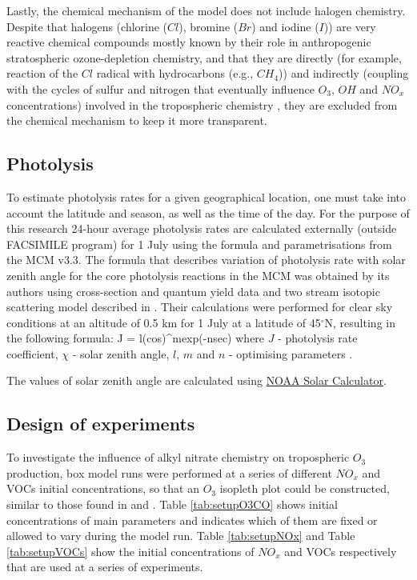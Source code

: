 \documentclass[11pt,a4paper]{article}
\newcounter{matriz}
\newenvironment{matriz}{\refstepcounter{matriz}\equation}{\tag{\thematriz}\endequation}
\begin{document}
Lastly, the chemical mechanism of the model does not include halogen chemistry. Despite that halogens (chlorine ($Cl$), bromine ($Br$) and iodine ($I$)) are very reactive chemical compounds mostly known by their role in anthropogenic stratospheric ozone-depletion chemistry, and that they are directly (for example, reaction of the $Cl$ radical with hydrocarbons (e.g., $CH_4$)) and indirectly (coupling with the cycles of sulfur and nitrogen that eventually influence $O_3$, $OH$ and $NO_x$ concentrations) involved in the tropospheric chemistry \citep{VonGlasow2014,Platt2003}, they are excluded from the chemical mechanism to keep it more transparent.

\subsection{Photolysis} \label{sec:method_photolysis}
To estimate photolysis rates for a given geographical location, one must take into account the latitude and season, as well as the time of the day. For the purpose of this research 24-hour average photolysis rates are calculated externally (outside FACSIMILE program) for 1 July using the formula and parametrisations from the MCM v3.3. The formula that describes variation of photolysis rate with solar zenith angle for the core photolysis reactions in the MCM was obtained by its authors using cross-section and quantum yield data and two stream isotopic scattering model described in \citep{Hayman1997}. Their calculations were performed for clear sky conditions at an altitude of 0.5 km for 1 July at a latitude of 45$^{\circ}$N, resulting in the following formula:
\begin{matriz} \label{eq:MCMphotolysis}
J = l(cos\chi)^mexp(-nsec\chi)
\end{matriz}
where $J$ - photolysis rate coefficient, $\chi$ - solar zenith angle, $l$, $m$ and $n$ - optimising parameters \citep{Jenkin1997,Saunders2003}.

The values of solar zenith angle are calculated using \href{http://www.esrl.noaa.gov/gmd/grad/solcalc/}{NOAA Solar Calculator}.

\subsection{Design of experiments} \label{sec:method_expdesign}
To investigate the influence of alkyl nitrate chemistry on tropospheric $O_3$ production, box model runs were performed at a series of different $NO_x$ and VOCs initial concentrations, so that an $O_3$ isopleth plot could be constructed, similar to those found in \citep{Dodge1977} and \citep{Sillman1999}.   Table \ref{tab:setupO3CO} shows initial concentrations of main parameters and indicates which of them are fixed or allowed to vary during the model run. Table \ref{tab:setupNOx} and Table \ref{tab:setupVOCs} show the initial concentrations of $NO_x$ and VOCs respectively that are used at a series of experiments.
\end{document}
